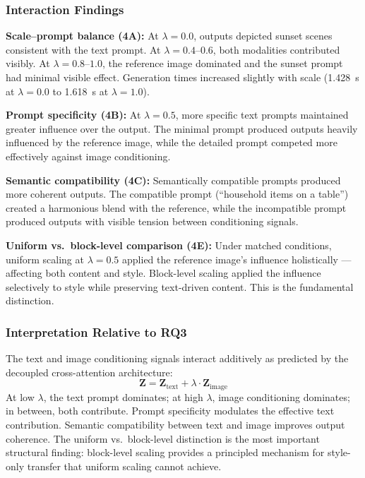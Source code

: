 \documentclass[conference]{IEEEtran}
\begin{document}
\subsubsection{Interaction Findings}
\textbf{Scale--prompt balance (4A):} At \(\lambda = 0.0\), outputs depicted sunset scenes consistent with the text prompt. At \(\lambda = 0.4\)--\(0.6\), both modalities contributed visibly. At \(\lambda = 0.8\)--\(1.0\), the reference image dominated and the sunset prompt had minimal visible effect. Generation times increased slightly with scale (1.428~s at \(\lambda = 0.0\) to 1.618~s at \(\lambda = 1.0\)).

\textbf{Prompt specificity (4B):} At \(\lambda = 0.5\), more specific text prompts maintained greater influence over the output. The minimal prompt produced outputs heavily influenced by the reference image, while the detailed prompt competed more effectively against image conditioning.

\textbf{Semantic compatibility (4C):} Semantically compatible prompts produced more coherent outputs. The compatible prompt (``household items on a table'') created a harmonious blend with the reference, while the incompatible prompt produced outputs with visible tension between conditioning signals.

\textbf{Uniform vs.\ block-level comparison (4E):} Under matched conditions, uniform scaling at \(\lambda = 0.5\) applied the reference image's influence holistically --- affecting both content and style. Block-level scaling applied the influence selectively to style while preserving text-driven content. This is the fundamental distinction.

\subsubsection{Interpretation Relative to RQ3}
The text and image conditioning signals interact additively as predicted by the decoupled cross-attention architecture:
\begin{equation}
\mathbf{Z} = \mathbf{Z}_{\text{text}} + \lambda \cdot \mathbf{Z}_{\text{image}}
\end{equation}
At low \(\lambda\), the text prompt dominates; at high \(\lambda\), image conditioning dominates; in between, both contribute. Prompt specificity modulates the effective text contribution. Semantic compatibility between text and image improves output coherence. The uniform vs.\ block-level distinction is the most important structural finding: block-level scaling provides a principled mechanism for style-only transfer that uniform scaling cannot achieve.
\end{document}
